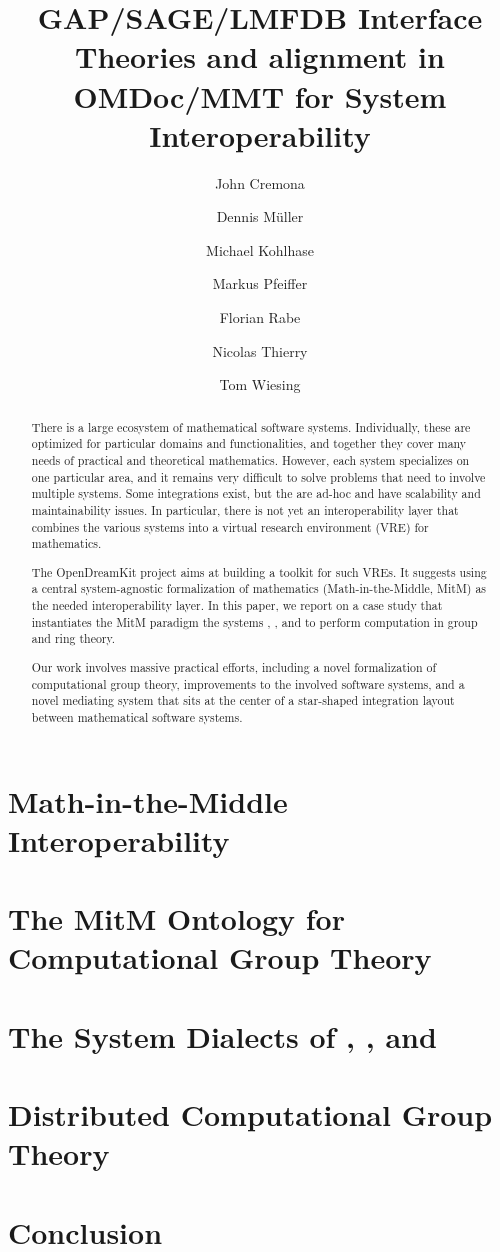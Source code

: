 \documentclass[book]{deliverablereport}
\title{GAP/SAGE/LMFDB Interface Theories and alignment in OMDoc/MMT for System Interoperability}
\author{John Cremona}
\author{Dennis M\"uller}
\author{Michael Kohlhase}
\author{Markus Pfeiffer}
\author{Florian Rabe}
\author{Nicolas Thierry}
\author{Tom Wiesing}
\begin{document}
\begin{abstract}
  There is a large ecosystem of mathematical software systems.  Individually, these are
  optimized for particular domains and functionalities, and together they cover many needs
  of practical and theoretical mathematics.  However, each system specializes on one
  particular area, and it remains very difficult to solve problems that need to involve
  multiple systems.  Some integrations exist, but the are ad-hoc and have scalability and
  maintainability issues.  In particular, there is not yet an interoperability layer that
  combines the various systems into a virtual research environment (VRE) for mathematics.
  
  The OpenDreamKit project aims at building a toolkit for such VREs.  It suggests using a
  central system-agnostic formalization of mathematics (Math-in-the-Middle, MitM) as the
  needed interoperability layer.  In this paper, we report on a case study that
  instantiates the MitM paradigm the systems \GAP, \Sage, and \Singular to perform
  computation in group and ring theory.
 
  Our work involves massive practical efforts, including a novel formalization of
  computational group theory, improvements to the involved software systems, and a novel
  mediating system that sits at the center of a star-shaped integration layout between
  mathematical software systems.
\end{abstract}

\maketitle
\newpage\tableofcontents\newpage
{}



\section{Math-in-the-Middle Interoperability}\label{sec:mitm}


\section{The MitM Ontology for Computational Group Theory}\label{sec:cgt}


\section{The System Dialects of \GAP, \Sage, and \Singular}\label{sec:apit}


\section{Distributed Computational Group Theory}\label{sec:case}


\section{Conclusion}\label{sec:concl}
  
\end{document}
